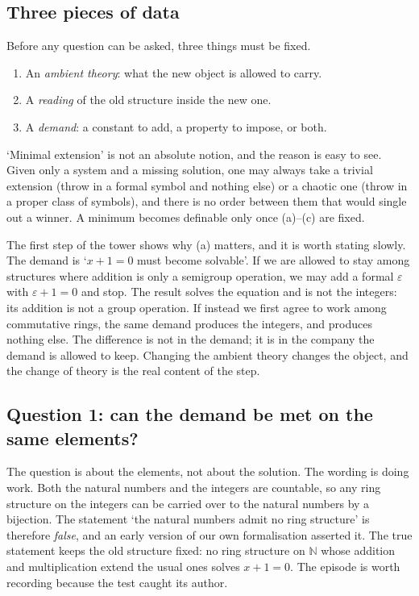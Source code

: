 \documentclass[12pt,a4paper]{article}
\begin{document}
\subsection{Three pieces of data}

Before any question can be asked, three things must be fixed.

\begin{enumerate}[label=(\alph*),leftmargin=2.2em]
\item An \emph{ambient theory}: what the new object is allowed to carry.
\item A \emph{reading} of the old structure inside the new one.
\item A \emph{demand}: a constant to add, a property to impose, or both.
\end{enumerate}

`Minimal extension' is not an absolute notion, and the reason is easy to see.
Given only a system and a missing solution, one may always take a trivial
extension (throw in a formal symbol and nothing else) or a chaotic one (throw in a
proper class of symbols), and there is no order between them that would single
out a winner.  A minimum becomes definable only once (a)--(c) are fixed.

The first step of the tower shows why (a) matters, and it is worth stating slowly.
The demand is `$x+1=0$ must become solvable'.  If we are allowed to stay among
structures where addition is only a semigroup operation, we may add a formal
$\varepsilon$ with $\varepsilon+1=0$ and stop.  The result solves the equation and
is not the integers: its addition is not a group operation.  If instead we first
agree to work among commutative rings, the same demand produces the integers, and
produces nothing else.  The difference is not in the demand; it is in the company
the demand is allowed to keep.  Changing the ambient theory changes the object,
and the change of theory is the real content of the step.

\subsection{Question 1: can the demand be met on the same elements?}

The question is about the elements, not about the solution.  The wording is doing
work.  Both the natural numbers and the integers are countable, so any ring
structure on the integers can be carried over to the natural numbers by a
bijection.  The statement `the natural numbers admit no ring structure' is
therefore \emph{false}, and an early version of our own formalisation asserted it.
The true statement keeps the old structure fixed: no ring structure on
$\mathbb{N}$ whose addition and multiplication extend the usual ones solves
$x+1=0$.  The episode is worth recording because the test caught its author.
\end{document}
